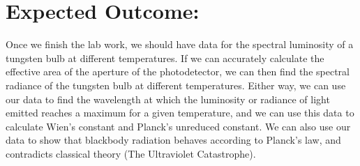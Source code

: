 \documentclass{article}
\begin{document}
\section{Expected Outcome:} %
\label{sec:expected_outcome_}
Once we finish the lab work, we should have data for the spectral luminosity of a tungsten bulb at different temperatures.  If we can accurately calculate the effective area of the aperture of the photodetector, we can then find the spectral radiance of the tungsten bulb at different temperatures.  Either way, we can use our data to find the wavelength at which the luminosity or radiance of light emitted reaches a maximum for a given temperature, and we can use this data to calculate Wien’s constant and Planck’s unreduced constant.   We can also use our data to show that blackbody radiation behaves according to Planck’s law, and contradicts classical theory (The Ultraviolet Catastrophe).
\end{document}
